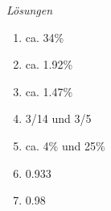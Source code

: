 \clearpage
\emph{Lösungen}
\begin{enumerate}
  \item ca. 34\%
  \item ca. 1.92\%
  \item ca. 1.47\%

  \item 3/14 und 3/5
  \item ca. 4\% und 25\%
  \item 0.933
  \item 0.98
\end{enumerate}












\clearpage
